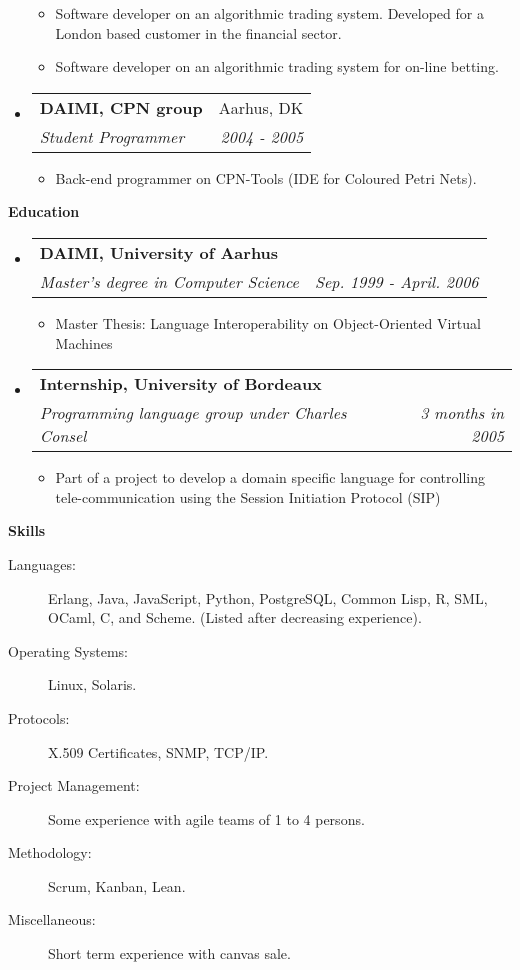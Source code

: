 \documentclass[a4paper,11pt]{article}
\makeatletter
\newcommand{\resitem}[1]{\item #1 \vspace{-2pt}}
\newcommand{\resheading}[1]{{\vspace{5mm}\Large
    \colorbox{mygrey}{\begin{minipage}{\textwidth}{\textbf{#1
            \vphantom{p\^{E}}}}\end{minipage}}}}
\newcommand{\ressubheading}[4]{
\begin{tabular*}{172mm}{l@{\extracolsep{\fill}}r}
		\textbf{#1} & #2 \\
		\textit{#3} & \textit{#4} \\
\end{tabular*}\vspace{-6pt}}
\makeatother
\begin{document}
\begin{itemize}
  \begin{itemize}

    \resitem{Software developer on an algorithmic trading system.
      Developed for a London based customer in the financial sector.}

    \resitem{Software developer on an algorithmic trading system for
      on-line betting.}

  \end{itemize}

\item  \ressubheading{DAIMI, CPN group}{Aarhus, DK}{Student Programmer}{2004 - 2005}

  \begin{itemize}

    \resitem{Back-end programmer on CPN-Tools (IDE for Coloured Petri
      Nets).}

  \end{itemize}

\end{itemize}

\pagebreak

\resheading{Education}
\begin{itemize}
\item \ressubheading{DAIMI, University of Aarhus}{}{Master's degree in
  Computer Science}{Sep. 1999 - April. 2006}
	\begin{itemize}
	  \resitem{Master Thesis: Language Interoperability on Object-Oriented Virtual Machines}
	\end{itemize}

\item \ressubheading{Internship, University of Bordeaux}{}{Programming
  language group under Charles Consel}{3 months in 2005}
	\begin{itemize}
	  \resitem{Part of a project to develop a domain specific
            language for controlling tele-communication using the
            Session Initiation Protocol (SIP)}
	\end{itemize}


\end{itemize}

\resheading{Skills}

\begin{description}
\item[Languages:] Erlang, Java, JavaScript, Python, PostgreSQL, Common
  Lisp, R, SML, OCaml, C, and Scheme.  (Listed after decreasing
  experience).
\item[Operating Systems:] Linux, Solaris.
\item[Protocols:] X.509 Certificates, SNMP, TCP/IP.
\item[Project Management:] Some experience with agile teams of 1 to 4
  persons.
\item[Methodology:] Scrum, Kanban, Lean.
\item[Miscellaneous:] Short term experience with canvas sale.
\end{description}
\end{document}
